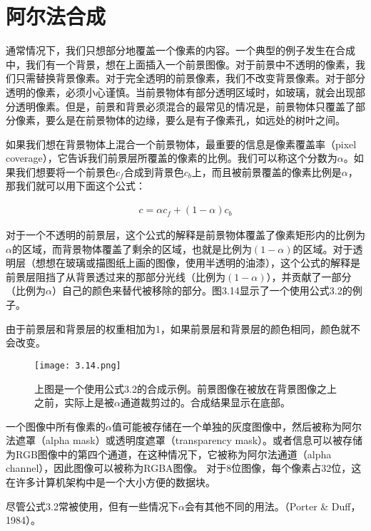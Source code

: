\documentclass[lang=cn,12pt]{elegantbook}
\begin{document}
\section{阿尔法合成}

通常情况下，我们只想部分地覆盖一个像素的内容。一个典型的例子发生在合成中，我们有一个背景，想在上面插入一个前景图像。对于前景中不透明的像素，我们只需替换背景像素。对于完全透明的前景像素，我们不改变背景像素。对于部分透明的像素，必须小心谨慎。当前景物体有部分透明区域时，如玻璃，就会出现部分透明像素。但是，前景和背景必须混合的最常见的情况是，前景物体只覆盖了部分像素，要么是在前景物体的边缘，要么是有子像素孔，如远处的树叶之间。

如果我们想在背景物体上混合一个前景物体，最重要的信息是像素覆盖率（pixel coverage），它告诉我们前景层所覆盖的像素的比例。我们可以称这个分数为$\alpha $。如果我们想要将一个前景色$c_f$合成到背景色$c_b$上，而且被前景覆盖的像素比例是$\alpha $，那我们就可以用下面这个公式：

\begin{align}
  c = \alpha c_f + (1 - \alpha )c_b
\end{align}

对于一个不透明的前景层，这个公式的解释是前景物体覆盖了像素矩形内的比例为$\alpha $的区域，而背景物体覆盖了剩余的区域，也就是比例为$(1-\alpha )$的区域。对于透明层（想想在玻璃或描图纸上画的图像，使用半透明的油漆），这个公式的解释是前景层阻挡了从背景透过来的那部分光线（比例为$(1-\alpha )$），并贡献了一部分（比例为$\alpha $）自己的颜色来替代被移除的部分。图3.14显示了一个使用公式3.2的例子。

\begin{note}
由于前景层和背景层的权重相加为1，如果前景层和背景层的颜色相同，颜色就不会改变。
\end{note}

\begin{figure}[htb]
  \centering
  \texttt{[image: 3.14.png]}
  \caption{上图是一个使用公式3.2的合成示例。前景图像在被放在背景图像之上之前，实际上是被$\alpha $通道裁剪过的。合成结果显示在底部。}
\end{figure}

一个图像中所有像素的$\alpha $值可能被存储在一个单独的灰度图像中，然后被称为阿尔法遮罩（alpha mask）或透明度遮罩（transparency mask）。或者信息可以被存储为RGB图像中的第四个通道，在这种情况下，它被称为阿尔法通道（alpha channel），因此图像可以被称为RGBA图像。
对于8位图像，每个像素占32位，这在许多计算机架构中是一个大小方便的数据块。

尽管公式3.2常被使用，但有一些情况下$\alpha $会有其他不同的用法。（Porter \& Duff，1984）。
\end{document}
